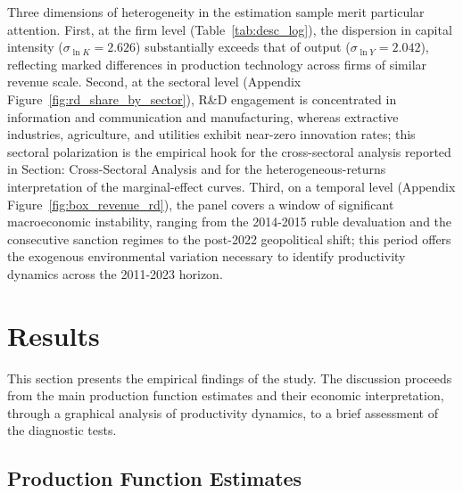 \documentclass[a4paper, 12pt]{article}
\begin{document}
Three dimensions of heterogeneity in the estimation sample merit particular attention. First, at the firm level (Table~\ref{tab:desc_log}), the dispersion in capital intensity ($\sigma_{\ln K} = 2.626$) substantially exceeds that of output ($\sigma_{\ln Y} = 2.042$), reflecting marked differences in production technology across firms of similar revenue scale. Second, at the sectoral level (Appendix Figure~\ref{fig:rd_share_by_sector}), R\&D engagement is concentrated in information and communication and manufacturing, whereas extractive industries, agriculture, and utilities exhibit near-zero innovation rates; this sectoral polarization is the empirical hook for the cross-sectoral analysis reported in Section: Cross-Sectoral Analysis and for the heterogeneous-returns interpretation of the \textcite{doraszelski2013r} marginal-effect curves. Third, on a temporal level (Appendix Figure~\ref{fig:box_revenue_rd}), the panel covers a window of significant macroeconomic instability, ranging from the 2014-2015 ruble devaluation and the consecutive sanction regimes to the post-2022 geopolitical shift; this period offers the exogenous environmental variation necessary to identify productivity dynamics across the 2011-2023 horizon.


\section{Results}

This section presents the empirical findings of the study. The discussion proceeds from the main production function estimates and their economic interpretation, through a graphical analysis of productivity dynamics, to a brief assessment of the diagnostic tests.

\subsection{Production Function Estimates}
\end{document}
